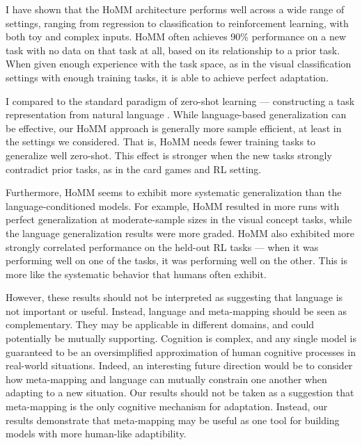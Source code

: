 I have shown that the HoMM architecture performs well across a wide range of settings, ranging from regression to classification to reinforcement learning, with both toy and complex inputs. HoMM often achieves 90\% performance on a new task with no data on that task at all, based on its relationship to a prior task. When given enough experience with the task space, as in the visual classification settings with enough training tasks, it is able to achieve perfect adaptation. \par

I compared to the standard paradigm of zero-shot learning --- constructing a task representation from natural language \citep[e.g.][also see below]{Larochelle2008}. While language-based generalization can be effective, our HoMM approach is generally more sample efficient, at least in the settings we considered. That is, HoMM needs fewer training tasks to generalize well zero-shot. This effect is stronger when the new tasks strongly contradict prior tasks, as in the card games and RL setting. \par

Furthermore, HoMM seems to exhibit more systematic generalization than the language-conditioned models. For example, HoMM resulted in more runs with perfect generalization at moderate-sample sizes in the visual concept tasks, while the language generalization results were more graded. HoMM also exhibited more strongly correlated performance on the held-out RL tasks --- when it was performing well on one of the tasks, it was performing well on the other. This is more like the systematic behavior that humans often exhibit. \par

However, these results should not be interpreted as suggesting that language is not important or useful. Instead, language and meta-mapping should be seen as complementary. They may be applicable in different domains, and could potentially be mutually supporting. Cognition is complex, and any single model is guaranteed to be an oversimplified approximation of human cognitive processes in real-world situations. Indeed, an interesting future direction would be to consider how meta-mapping and language can mutually constrain one another when adapting to a new situation. Our results should not be taken as a suggestion that meta-mapping is the only cognitive mechanism for adaptation. Instead, our results demonstrate that meta-mapping may be useful as one tool for building models with more human-like adaptibility. \par

